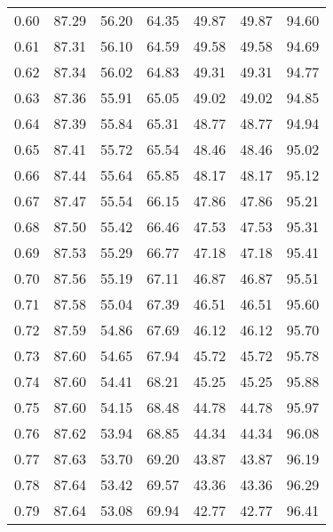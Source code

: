 \begin{tabular}{|c|c|c|c|c|c|c|}
      0.60 &     87.29 &     56.20 &      64.35 &   49.87 &      49.87 &         94.60 \\
      0.61 &     87.31 &     56.10 &      64.59 &   49.58 &      49.58 &         94.69 \\
      0.62 &     87.34 &     56.02 &      64.83 &   49.31 &      49.31 &         94.77 \\
      0.63 &     87.36 &     55.91 &      65.05 &   49.02 &      49.02 &         94.85 \\
      0.64 &     87.39 &     55.84 &      65.31 &   48.77 &      48.77 &         94.94 \\
      0.65 &     87.41 &     55.72 &      65.54 &   48.46 &      48.46 &         95.02 \\
      0.66 &     87.44 &     55.64 &      65.85 &   48.17 &      48.17 &         95.12 \\
      0.67 &     87.47 &     55.54 &      66.15 &   47.86 &      47.86 &         95.21 \\
      0.68 &     87.50 &     55.42 &      66.46 &   47.53 &      47.53 &         95.31 \\
      0.69 &     87.53 &     55.29 &      66.77 &   47.18 &      47.18 &         95.41 \\
      0.70 &     87.56 &     55.19 &      67.11 &   46.87 &      46.87 &         95.51 \\
      0.71 &     87.58 &     55.04 &      67.39 &   46.51 &      46.51 &         95.60 \\
      0.72 &     87.59 &     54.86 &      67.69 &   46.12 &      46.12 &         95.70 \\
      0.73 &     87.60 &     54.65 &      67.94 &   45.72 &      45.72 &         95.78 \\
      0.74 &     87.60 &     54.41 &      68.21 &   45.25 &      45.25 &         95.88 \\
      0.75 &     87.60 &     54.15 &      68.48 &   44.78 &      44.78 &         95.97 \\
      0.76 &     87.62 &     53.94 &      68.85 &   44.34 &      44.34 &         96.08 \\
      0.77 &     87.63 &     53.70 &      69.20 &   43.87 &      43.87 &         96.19 \\
      0.78 &     87.64 &     53.42 &      69.57 &   43.36 &      43.36 &         96.29 \\
      0.79 &     87.64 &     53.08 &      69.94 &   42.77 &      42.77 &         96.41 \\

\end{tabular}
